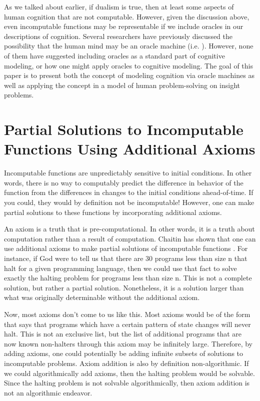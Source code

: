 As we talked about earlier, if dualism is true, then at least some aspects of human cognition that are not computable.  However, given the discussion above, even incomputable functions may be representable if we include oracles in our descriptions of cognition.  Several researchers have previously discussed the possibility that the human mind may be an oracle machine (i.e. \citet{copeland1998}).  However, none of them have suggested including oracles as a standard part of cognitive modeling, or how one might apply oracles to cognitive modeling.  The goal of this paper is to present both the concept of modeling cognition via oracle machines as well as applying the concept in a model of human problem-solving on insight problems.

\section[Partial Solutions to Incomputable Functions]{Partial Solutions to Incomputable Functions Using Additional Axioms}

Incomputable functions are unpredictably sensitive to initial conditions.  In other words, there is no way to computably predict the difference in behavior of the function from the differences in changes to the initial conditions ahead-of-time.  If you could, they would by definition not be incomputable!  However, one can make partial solutions to these functions by incorporating additional axioms.

An axiom is a truth that is pre-computational.  In other words, it is a truth about computation rather than a result of computation.  Chaitin has shown that one can use additional axioms to make partial solutions of incomputable functions \citep{chaitin1982}.  For instance, if God were to tell us that there are 30 programs less than size n that halt for a given programming language, then we could use that fact to solve exactly the halting problem for programs less than size n.  This is not a complete solution, but rather a partial solution.  Nonetheless, it is a solution larger than what was originally determinable without the additional axiom.

Now, most axioms don't come to us like this.  Most axioms would be of the form that says that programs which have a certain pattern of state changes will never halt.  This is not an exclusive list, but the list of additional programs that are now known non-halters through this axiom may be infinitely large.  Therefore, by adding axioms, one could potentially be adding infinite subsets of solutions to incomputable problems.  Axiom addition is also by definition non-algorithmic.  If we could algorithmically add axioms, then the halting problem would be solvable.  Since the halting problem is not solvable algorithmically, then axiom addition is not an algorithmic endeavor.

